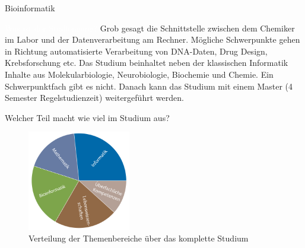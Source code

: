 	\begin{Huge}
				Bioinformatik
			\end{Huge}
			\begin{exampleblock}{\textcolor{white}{Was ist der Studiengang?}}
				Grob gesagt die Schnittstelle zwischen dem Chemiker im Labor und der Datenverarbeitung am Rechner. Mögliche Schwerpunkte gehen in Richtung automatisierte Verarbeitung von DNA-Daten, Drug Design, Krebsforschung etc.
				Das Studium beinhaltet neben der klassischen Informatik Inhalte aus Molekularbiologie, Neurobiologie, Biochemie und Chemie. Ein Schwerpunktfach gibt es nicht. Danach kann das Studium mit einem Master (4 Semester Regelstudienzeit) weitergeführt werden.
			\end{exampleblock}
		
			\begin{block}{Welcher Teil macht wie viel im Studium aus?}
				\begin{figure}[h!]
						\includegraphics[width=0.4\textwidth]{charts/bioinformatik-Piechart.pdf}
					\caption{Verteilung der Themenbereiche über das komplette Studium}
				\end{figure}
			\end{block}
		
